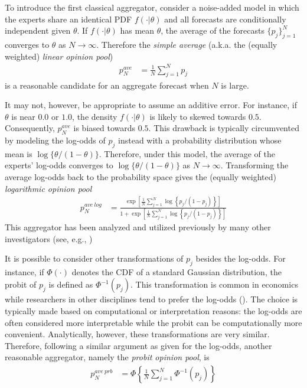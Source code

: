 \documentclass[11pt]{article}
\theoremstyle{definition}
\theoremstyle{definition}
\begin{document}
To introduce the first classical aggregator, consider a noise-added model in which the experts share an identical PDF $f(\cdot | \theta)$ and all forecasts are conditionally independent given $\theta$. If $f(\cdot | \theta)$ has mean $\theta$, the average of the forecasts $\{ p_j \}_{j=1}^N$ converges to $\theta$ as $N \to \infty$. Therefore the \textit{simple average} (a.k.a. the (equally weighted) \textit{linear opinion pool})
\begin{align*}
p_N^{ave} &= \frac{1}{N} \sum_{j=1}^N p_j
\end{align*}
is a reasonable candidate for an aggregate forecast when $N$ is large.

It may not, however, be appropriate to assume an additive error. For instance, if $\theta$ is near $0.0$ or $1.0$,  the density $f(\cdot | \theta)$ is likely to skewed towards $0.5$.  Consequently, $p_{N}^{ave}$ is biased towards $0.5$. This drawback is typically circumvented by modeling the log-odds of $p_j$ instead with a probability distribution whose mean is $\log\{\theta/(1-\theta)\}$. Therefore, under this model, the average of the experts' log-odds converges to $\log\{\theta/(1-\theta)\}$ as $N \to \infty$. Transforming the average log-odds back to the probability space gives the (equally weighted) \textit{logarithmic opinion pool}
\begin{align*}
p_N^{ave\ log} &= \frac{\exp\left[ \frac{1}{N} \sum_{j=1}^N \log\left\{p_j / (1-p_j)\right\} \right]}{1+\exp\left[ \frac{1}{N} \sum_{j=1}^N \log\left\{p_j / (1-p_j)\right\} \right]}
\end{align*}
This aggregator has been analyzed and utilized previously by many other investigators (see, e.g., \cite{dawid1995coherent, Genest, bacharach1975group})

It is possible to consider other transformations of $p_j$ besides the log-odds. For instance,  if $\Phi(\cdot)$ denotes the CDF of a standard Gaussian distribution, the probit of $p_j$ is defined as $\Phi^{-1}(p_j)$. This transformation is common in economics while researchers in other disciplines tend to prefer the log-odds (\cite{bryan2013regression}). The choice is typically made based on computational or interpretation reasons: the log-odds are often considered more interpretable while the probit can be computationally more convenient. Analytically, however, these transformations are very similar. Therefore, following a similar argument as given for the log-odds, another reasonable aggregator, namely the \textit{probit opinion pool}, is
\begin{align*}
p_N^{ave\ prb} &= \Phi \left\{ \frac{1}{N} \sum_{j=1}^N \Phi^{-1}(p_j) \right\}
\end{align*}
\end{document}
